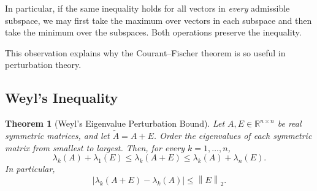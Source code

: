\documentclass[14pt,letterpaper]{article}
\theoremstyle{plain}
\newtheorem{theorem}{Theorem}[section]
\theoremstyle{definition}
\theoremstyle{remark}
\newcommand{\R}{\mathbb{R}}
\newcommand{\norm}[1]{\left\lVert #1 \right\rVert}
\newcommand{\abs}[1]{\left| #1 \right|}
\begin{document}
In particular, if the same inequality holds for all
vectors in \emph{every} admissible subspace, we may
first take the maximum over vectors in each subspace
and then take the minimum over the subspaces. Both
operations preserve the inequality.

This observation explains why the Courant--Fischer
theorem is so useful in perturbation theory.


\subsection{Weyl's Inequality}
\label{subsec:weyl_theorem}

\begin{theorem}[Weyl's Eigenvalue Perturbation Bound]
\label{thm:weyl}
Let $A,E\in\R^{n\times n}$ be real symmetric matrices,
and let $\widetilde A=A+E$. Order the eigenvalues of
each symmetric matrix from smallest to largest.
Then, for every $k=1,\ldots,n$,
\[
\boxed{
\lambda_k(A)+\lambda_1(E)
\leq \lambda_k(A+E)
\leq \lambda_k(A)+\lambda_n(E).
}
\]
In particular,
\[
\boxed{
\abs{\lambda_k(A+E)-\lambda_k(A)}
\leq\norm{E}_2.
}
\]
\end{theorem}
\end{document}
